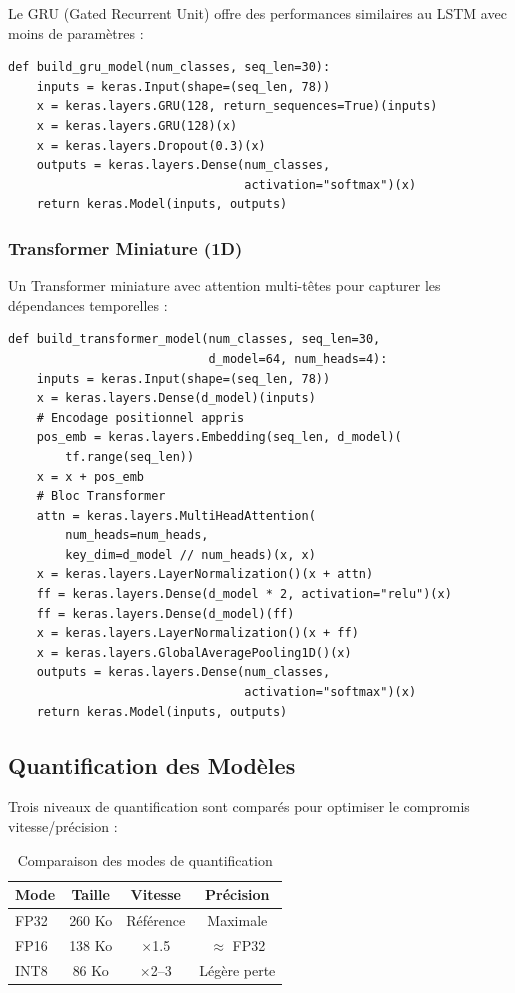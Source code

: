 Le GRU (Gated Recurrent Unit) offre des performances similaires au LSTM avec moins de paramètres :

\begin{lstlisting}[style=python, caption={Architecture GRU}]
def build_gru_model(num_classes, seq_len=30):
    inputs = keras.Input(shape=(seq_len, 78))
    x = keras.layers.GRU(128, return_sequences=True)(inputs)
    x = keras.layers.GRU(128)(x)
    x = keras.layers.Dropout(0.3)(x)
    outputs = keras.layers.Dense(num_classes,
                                 activation="softmax")(x)
    return keras.Model(inputs, outputs)
\end{lstlisting}

\subsubsection{Transformer Miniature (1D)}

Un Transformer miniature avec attention multi-têtes pour capturer les dépendances temporelles :

\begin{lstlisting}[style=python, caption={Architecture Transformer 1D}]
def build_transformer_model(num_classes, seq_len=30,
                            d_model=64, num_heads=4):
    inputs = keras.Input(shape=(seq_len, 78))
    x = keras.layers.Dense(d_model)(inputs)
    # Encodage positionnel appris
    pos_emb = keras.layers.Embedding(seq_len, d_model)(
        tf.range(seq_len))
    x = x + pos_emb
    # Bloc Transformer
    attn = keras.layers.MultiHeadAttention(
        num_heads=num_heads,
        key_dim=d_model // num_heads)(x, x)
    x = keras.layers.LayerNormalization()(x + attn)
    ff = keras.layers.Dense(d_model * 2, activation="relu")(x)
    ff = keras.layers.Dense(d_model)(ff)
    x = keras.layers.LayerNormalization()(x + ff)
    x = keras.layers.GlobalAveragePooling1D()(x)
    outputs = keras.layers.Dense(num_classes,
                                 activation="softmax")(x)
    return keras.Model(inputs, outputs)
\end{lstlisting}

\subsection{Quantification des Modèles}

Trois niveaux de quantification sont comparés pour optimiser le compromis vitesse/précision :

\begin{table}[H]
    \centering
    \begin{tabular}{lccc}
        \toprule
        \textbf{Mode} & \textbf{Taille} & \textbf{Vitesse} & \textbf{Précision} \\
        \midrule
        FP32 & 260 Ko & Référence & Maximale \\
        FP16 & 138 Ko & $\times$1.5 & $\approx$ FP32 \\
        INT8 & 86 Ko & $\times$2--3 & Légère perte \\
        \bottomrule
    \end{tabular}
    \caption{Comparaison des modes de quantification}
\end{table}

